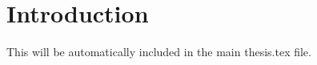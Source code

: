 \chapter{Introduction}

This will be automatically included in the main thesis.tex file.\cite{Leo:1994ur}
